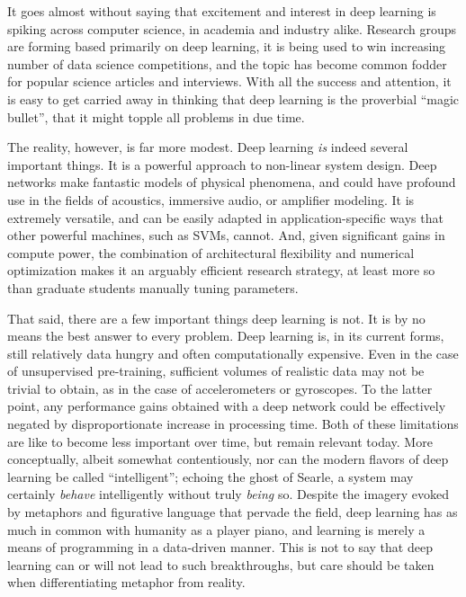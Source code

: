 It goes almost without saying that excitement and interest in deep learning is spiking across computer science, in academia and industry alike.
Research groups are forming based primarily on deep learning, it is being used to win increasing number of data science competitions, and the topic has become common fodder for popular science articles and interviews.
With all the success and attention, it is easy to get carried away in thinking that deep learning is the proverbial ``magic bullet'', that it might topple all problems in due time.

The reality, however, is far more modest.
Deep learning \emph{is} indeed several important things.
It is a powerful approach to non-linear system design.
Deep networks make fantastic models of physical phenomena, and could have profound use in the fields of acoustics, immersive audio, or amplifier modeling.
It is extremely versatile, and can be easily adapted in application-specific ways that other powerful machines, such as SVMs, cannot.
And, given significant gains in compute power, the combination of architectural flexibility and numerical optimization makes it an arguably efficient research strategy, at least more so than graduate students manually tuning parameters.

That said, there are a few important things deep learning is not.
It is by no means the best answer to every problem.
Deep learning is, in its current forms, still relatively data hungry and often computationally expensive.
Even in the case of unsupervised pre-training, sufficient volumes of realistic data may not be trivial to obtain, as in the case of accelerometers or gyroscopes.
To the latter point, any performance gains obtained with a deep network could be effectively negated by disproportionate increase in processing time.
Both of these limitations are like to become less important over time, but remain relevant today.
More conceptually, albeit somewhat contentiously, nor can the modern flavors of deep learning be called ``intelligent'';
echoing the ghost of Searle, a system may certainly \emph{behave} intelligently without truly \emph{being} so.
Despite the imagery evoked by metaphors and figurative language that pervade the field, deep learning has as much in common with humanity as a player piano, and learning is merely a means of programming in a data-driven manner.
This is not to say that deep learning can or will not lead to such breakthroughs, but care should be taken when differentiating metaphor from reality.

